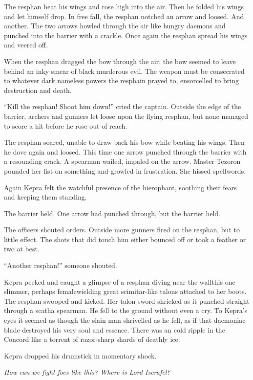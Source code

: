 \documentclass
  [a4paper,
   12pt,
   oneside
  ]%
  {article}
\begin{document}
The resphan beat his wings and rose high into the air. Then he folded his wings and let himself drop. In free fall, the resphan notched an arrow and loosed. And another. The two arrows howled through the air like hungry daemons and punched into the barrier with a crackle. Once again the resphan spread his wings and veered off.

When the resphan dragged the bow through the air, the bow seemed to leave behind an inky smear of black murderous evil. 
The weapon must be consecrated to whatever dark nameless powers the resphain prayed to, ensorcelled to bring destruction and death.

``Kill the resphan! Shoot him down!'' cried the captain. Outside the edge of the barrier, archers and gunners let loose upon the flying resphan, but none managed to score a hit before he rose out of reach. 

The resphan soared, unable to draw back his bow while beating his wings. 
Then he dove again and loosed. This time one arrow punched through the barrier with a resounding crack. 
A spearman wailed, impaled on the arrow. Master Tezoron pounded her fist on something and growled in frustration. She hissed spellwords. 

Again Kepra felt the watchful presence of the hierophant, soothing their fears and keeping them standing.

The barrier held. One arrow had punched through, but the barrier held. 

The officers shouted orders. Outside more gunners fired on the resphan, but to little effect. The shots that did touch him either bounced off or took a feather or two at best.

``Another resphan!'' someone shouted. 

Kepra peeked and caught a glimpse of a resphan diving near the wall\dash{}this one slimmer, perhaps female\dash{}wielding great scimitar-like talons attached to her boots.
The resphan swooped and kicked. Her talon-sword shrieked as it punched straight through a scatha spearman. 
He fell to the ground without even a cry. 
To Kepra’s eyes it seemed as though the slain man shrivelled as he fell, as if that daemoniac blade destroyed his very soul and essence. There was an cold ripple in the Concord like a torrent of razor-sharp shards of deathly ice. 

Kepra dropped his drumstick in momentary shock. 

\emph{How can we fight foes like this? Where is Lord Iscrafel?}
\end{document}
